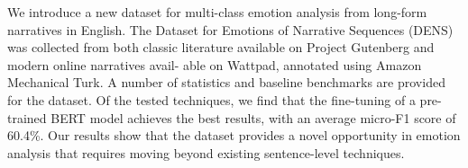 We introduce a new dataset for multi-class emotion analysis from long-form narratives in English. The Dataset for Emotions of Narrative Sequences (DENS) was collected from both classic literature available on Project Gutenberg and modern online narratives avail- able on Wattpad, annotated using Amazon Mechanical Turk. A number of statistics and baseline benchmarks are provided for the dataset. Of the tested techniques, we find that the fine-tuning of a pre-trained BERT model achieves the best results, with an average micro-F1 score of 60.4\%. Our results show that the dataset provides a novel opportunity in emotion analysis that requires moving beyond existing sentence-level techniques.
